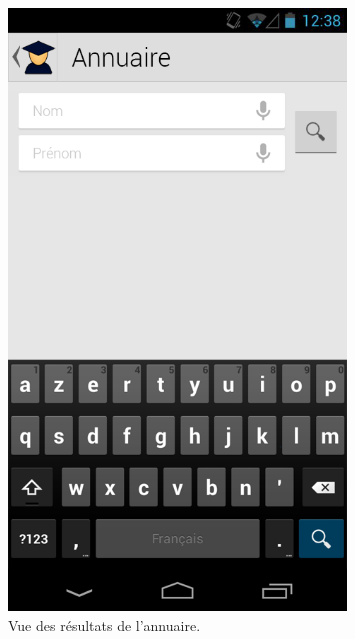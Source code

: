 \documentclass [pdftex,12pt] {report}
\begin{document}
\begin{figure}
\begin{minipage}[t]{8cm}
    \includegraphics[width=0.8\textwidth]{resources/ui_preview/06}
    \caption{Vue des résultats de l'annuaire.}
    \label{fig:06}
  \end{minipage}
  \hspace{-60pt}
\end{figure}
\end{document}
